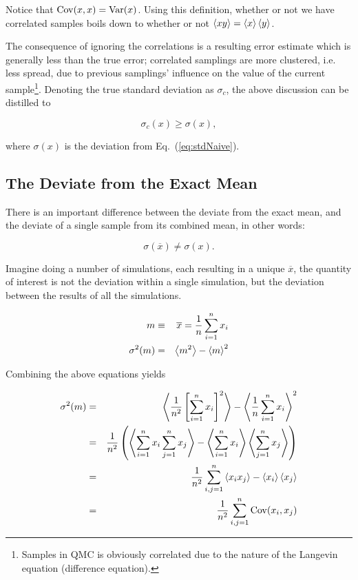 Notice that $\mathrm{Cov}(x,x) = \mathrm{Var}(x)$. Using this definition, whether or not we have correlated samples boils down to whether or not $\left< xy \right> = \left< x \right>\left< y \right>$. 

The consequence of ignoring the correlations is a resulting error estimate which is generally less than the true error; correlated samplings are more clustered, i.e. less spread, due to previous samplings' influence on the value of the current sample\footnote{Samples in QMC is obviously correlated due to the nature of the Langevin equation (difference equation).}. Denoting the true standard deviation as $\sigma_c$, the above discussion can be distilled to

\begin{equation}
 \label{eq:trueVsNaiveSTD}
 \sigma_c(x) \ge \sigma(x),
\end{equation}

where $\sigma(x)$ is the deviation from Eq.~(\ref{eq:stdNaive}). 


\subsection{The Deviate from the Exact Mean}

There is an important difference between the deviate from the exact mean, and the deviate of a single sample from its combined mean, in other words:

\begin{equation}
 \sigma(\overline{x}) \ne \sigma(x).
\end{equation}

Imagine doing a number of simulations, each resulting in a unique $\overline{x}$, the quantity of interest is not the deviation within a single simulation, but the deviation between the results of all the simulations.

\begin{eqnarray}
 m &\equiv& \overline{x} = \frac{1}{n}\sum_{i=1}^n x_i \label{eq:meanx}\\
 \sigma^2(m) &=& \left< m^2 \right> - \left< m \right>^2 \label{eq:sigma_m}
\end{eqnarray}

Combining the above equations yields

\begin{eqnarray}
\label{eq:realErrorCovariance1}
  \sigma^2(m) &=& \left< \frac{1}{n^2}\left[\sum_{i=1}^nx_i\right]^2 \right> - \left< \frac{1}{n}\sum_{i=1}^n x_i \right>^2 \nonumber\\
              &=& \frac{1}{n^2}\left( \left< \sum_{i=1}^n x_i\sum_{j=1}^n x_j \right> - \left< \sum_{i=1}^n x_i \right>\left< \sum_{j=1}^n x_j \right>  \right) \nonumber\\
              &=& \frac{1}{n^2}\sum_{i,j=1}^n \left< x_ix_j \right> - \left< x_i \right>\left< x_j \right> \nonumber\\
              &=& \frac{1}{n^2}\sum_{i,j=1}^n \mathrm{Cov}(x_i, x_j)
\end{eqnarray}

